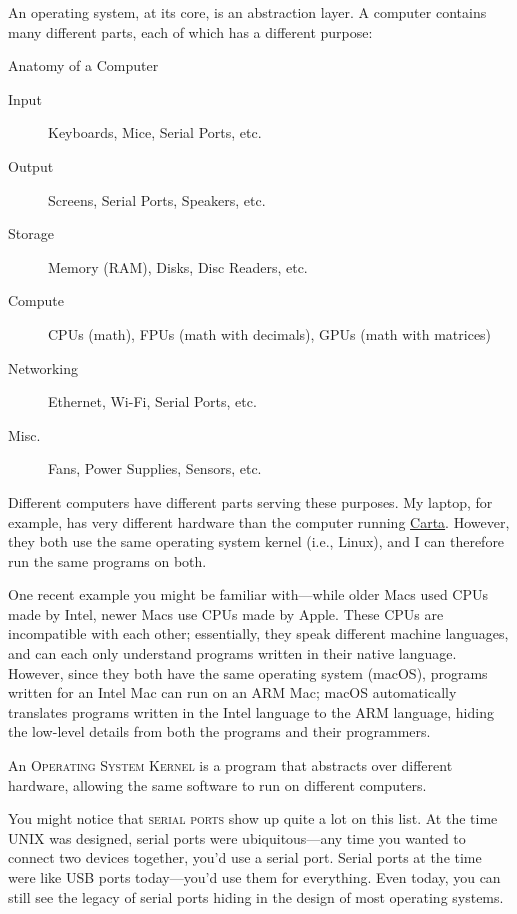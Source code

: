 An operating system, at its core, is an abstraction layer.  A computer contains
many different parts, each of which has a different purpose:

\begin{frame}{Anatomy of a Computer}
  \pause
  \begin{description}
    \item[Input]
      Keyboards, Mice, \alert<8>{Serial Ports}, etc.\pause
    \item[Output]
      Screens, \alert<8>{Serial Ports}, Speakers, etc.\pause
    \item[Storage]
      Memory (RAM), Disks, Disc Readers, etc.\pause
    \item[Compute]
      CPUs (math), FPUs (math with decimals), GPUs (math with matrices)\pause
    \item[Networking]
      Ethernet, Wi-Fi, \alert<8>{Serial Ports}, etc.\pause
    \item[Misc.]
      Fans, Power Supplies, Sensors, etc.\pause\pause
  \end{description}
   {
    Different computers have different parts serving these purposes.  My
    laptop, for example, has very different hardware than the computer running
    \href{https://carta.stanford.edu}{Carta}.  However, they both use the same
    operating system kernel (i.e., Linux), and I can therefore run the same
    programs on both.

    One recent example you might be familiar with---while older Macs used CPUs
    made by Intel, newer Macs use CPUs made by Apple.  These CPUs are
    incompatible with each other; essentially, they speak different machine
    languages, and can each only understand programs written in their native
    language. However, since they both have the same operating system (macOS),
    programs written for an Intel Mac can run on an ARM Mac; macOS
    automatically translates programs written in the Intel language to the ARM
    language, hiding the low-level details from both the programs and their
    programmers.
  }
  \begin{definition}[kernel]
    An \textsc{Operating System Kernel} is a program that abstracts over
    different hardware, allowing the same software to run on different
    computers.
  \end{definition}
\end{frame}

You might notice that \textsc{serial ports} show up quite a lot on this list.
At the time UNIX was designed, serial ports were ubiquitous---any time you
wanted to connect two devices together, you'd use a serial port.  Serial ports
at the time were like USB ports today---you'd use them for everything.  Even
today, you can still see the legacy of serial ports hiding in the design of
most operating systems.

